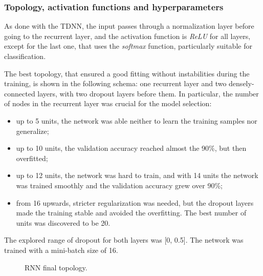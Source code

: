 \subsubsection{Topology, activation functions and hyperparameters}
As done with the TDNN, the input passes through a normalization layer before going to the recurrent layer, and the activation function is \textit{ReLU} for all layers, except for the last one, that uses the \textit{softmax} function, particularly suitable for classification.
\bigbreak

The best topology, that ensured a good fitting without instabilities during the training, is shown in the following schema: one recurrent layer and two densely-connected layers, with two dropout layers before them. In particular, the number of nodes in the recurrent layer was crucial for the model selection:
\begin{itemize}
	\item up to 5 units, the network was able neither to learn the training samples nor generalize;
	\item up to 10 units, the validation accuracy reached almost the 90\%, but then overfitted;
	\item up to 12 units, the network was hard to train, and with 14 units the network was trained smoothly and the validation accuracy grew over 90\%;
	\item from 16 upwards, stricter regularization was needed, but the dropout layers made the training stable and avoided the overfitting. The best number of units was discovered to be 20.
\end{itemize}
The explored range of dropout for both layers was [0, 0.5]. The network was trained with a mini-batch size of 16.

\begin{center}
	\begin{figure}[ht]
		\caption{RNN final topology.}
	\end{figure}
\end{center}

